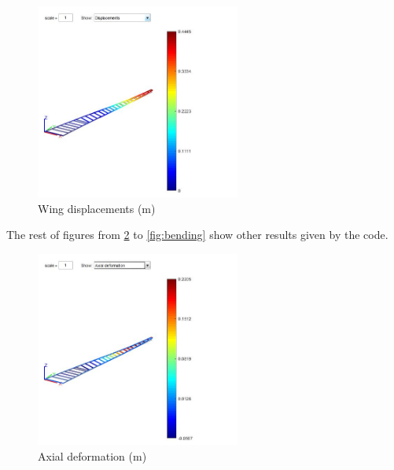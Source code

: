 \begin{figure}[h]
	\centering
	\includegraphics[width=0.6\textwidth]{img/Displacements.jpg}
	\caption{Wing displacements (m)}
	\label{fig:displacements}
\end{figure}

The rest of figures from \ref{fig:axial_disp} to \ref{fig:bending} show other
results given by the code.

\begin{figure}[h]
	\centering
	\includegraphics[width=0.6\textwidth]{img/AxialDeformation.jpg}
	\caption{Axial deformation (m)}
	\label{fig:axial_disp}
\end{figure}

